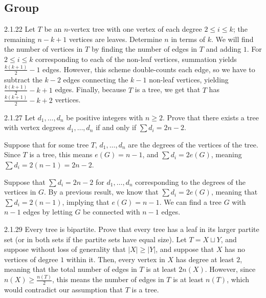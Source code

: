 \documentclass[9pt]{extarticle}
\begin{document}
  \subsection*{Group}%
  
  \begin{problem}{2.1.22}
    Let $T$ be an $n$-vertex tree with one vertex of each degree $2\leq i \leq k$; the remaining $n-k+1$ vertices are leaves. Determine $n$ in terms of $k$.
    \tcblower
    We will find the number of vertices in $T$ by finding the number of edges in $T$ and adding $1$. For $2\leq i\leq k$ corresponding to each of the non-leaf vertices, summation yields $\frac{k(k+1)}{2}-1$ edges. However, this scheme double-counts each edge, so we have to subtract the $k-2$ edges connecting the $k-1$ non-leaf vertices, yielding $\frac{k(k+1)}{2}-k+1$ edges. Finally, because $T$ is a tree, we get that $T$ has $\frac{k(k+1)}{2}-k+2$ vertices.
  \end{problem}
  \begin{problem}{2.1.27}
    Let $d_1,\dots,d_n$ be positive integers with $n\geq 2$. Prove that there exists a tree with vertex degrees $d_1,\dots,d_n$ if and only if $\sum d_i = 2n-2$.
    \tcblower
    \begin{description}[font=\normalfont\scshape]
      \item[($\Rightarrow$)] Suppose that for some tree $T$, $d_1,\dots,d_n$ are the degrees of the vertices of the tree. Since $T$ is a tree, this means $e(G) = n-1$, and $\sum d_i = 2e(G)$, meaning $\sum d_i = 2(n-1) = 2n-2$.
      \item[($\Leftarrow$)] Suppose that $\sum d_i = 2n-2$ for $d_1,\dots,d_n$ corresponding to the degrees of the vertices in $G$. By a previous result, we know that $\sum d_i = 2e(G)$, meaning that $\sum d_i = 2(n-1)$, implying that $e(G) = n-1$. We can find a tree $G$ with $n-1$ edges by letting $G$ be connected with $n-1$ edges.
    \end{description}
  \end{problem}
  \begin{problem}{2.1.29}
    Every tree is bipartite. Prove that every tree has a leaf in its larger partite set (or in both sets if the partite sets have equal size).
    \tcblower
    Let $T = X\sqcup Y$, and suppose without loss of generality that $|X| \geq |Y|$, and suppose that $X$ has no vertices of degree $1$ within it. Then, every vertex in $X$ has degree at least $2$, meaning that the total number of edges in $T$ is at least $2n(X)$. However, since $n(X) \geq \frac{n(T)}{2}$, this means the number of edges in $T$ is at least $n(T)$, which would contradict our assumption that $T$ is a tree.
  \end{problem}
\end{document}
